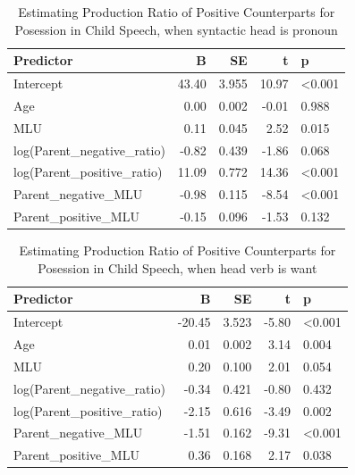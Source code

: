 \documentclass[
  english,
  man,floatsintext]{apa6}
\begin{document}
\begin{table}

\caption{\label{tab:unnamed-chunk-10}Estimating Production Ratio of Positive Counterparts for Posession in Child Speech, when syntactic head is pronoun}
\centering
\begin{tabular}[t]{l|r|r|r|l}
\hline
Predictor & B & SE & t & p\\
\hline
Intercept & 43.40 & 3.955 & 10.97 & <0.001\\
\hline
Age & 0.00 & 0.002 & -0.01 & 0.988\\
\hline
MLU & 0.11 & 0.045 & 2.52 & 0.015\\
\hline
log(Parent\_negative\_ratio) & -0.82 & 0.439 & -1.86 & 0.068\\
\hline
log(Parent\_positive\_ratio) & 11.09 & 0.772 & 14.36 & <0.001\\
\hline
Parent\_negative\_MLU & -0.98 & 0.115 & -8.54 & <0.001\\
\hline
Parent\_positive\_MLU & -0.15 & 0.096 & -1.53 & 0.132\\
\hline
\end{tabular}
\end{table}

\clearpage

\begin{table}

\caption{\label{tab:unnamed-chunk-11}Estimating Production Ratio of Positive Counterparts for Posession in Child Speech, when head verb is want}
\centering
\begin{tabular}[t]{l|r|r|r|l}
\hline
Predictor & B & SE & t & p\\
\hline
Intercept & -20.45 & 3.523 & -5.80 & <0.001\\
\hline
Age & 0.01 & 0.002 & 3.14 & 0.004\\
\hline
MLU & 0.20 & 0.100 & 2.01 & 0.054\\
\hline
log(Parent\_negative\_ratio) & -0.34 & 0.421 & -0.80 & 0.432\\
\hline
log(Parent\_positive\_ratio) & -2.15 & 0.616 & -3.49 & 0.002\\
\hline
Parent\_negative\_MLU & -1.51 & 0.162 & -9.31 & <0.001\\
\hline
Parent\_positive\_MLU & 0.36 & 0.168 & 2.17 & 0.038\\
\hline
\end{tabular}
\end{table}
\end{document}
